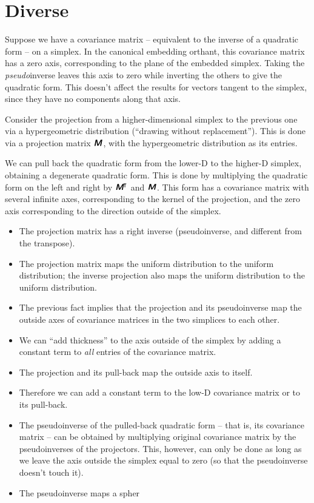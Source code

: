 \documentclass[\ifafour a4paper,12pt,\else a5paper,10pt,\fi%
onecolumn,oneside,article,%
british%
]{memoir}
\theoremstyle{remark}
\theoremstyle{innote}
\newcommand*{\mathte}[1]{\textbf{\textit{\textsf{#1}}}}
\renewcommand*{\|}[1][]{\nonscript\,#1\vert\nonscript\;\mathopen{}}
\newcommand*{\T}{^{\mathord{\!\intercal}}}%
\newcommand*{\ymm}{\mathte{M}}
\begin{document}
\section{Diverse}
\label{sec:diverse}

Suppose we have a covariance matrix -- equivalent to the inverse of a
quadratic form -- on a simplex. In the canonical embedding orthant, this
covariance matrix has a zero axis, corresponding to the plane of the
embedded simplex. Taking the \emph{pseudo}inverse leaves this axis to zero
while inverting the others to give the quadratic form. This doesn't affect
the results for vectors tangent to the simplex, since they have no
components along that axis.

Consider the projection from a higher-dimensional simplex to the previous
one via a hypergeometric distribution (\enquote{drawing without
  replacement}). This is done via a projection matrix $\ymm$, with the
hypergeometric distribution as its entries.

We can pull back the quadratic form from the lower-D to the higher-D
simplex, obtaining a degenerate quadratic form. This is done by multiplying
the quadratic form on the left and right by $\ymm\T$ and $\ymm$. This form
has a covariance matrix with several infinite axes, corresponding to the
kernel of the projection, and the zero axis corresponding to the direction
outside of the simplex.

\begin{itemize}
\item The projection matrix has a right inverse (pseudoinverse, and
  different from the transpose).
\item The projection matrix maps the uniform distribution to the uniform
  distribution; the inverse projection also maps the uniform distribution
  to the uniform distribution.
\item The previous fact implies that the projection and its pseudoinverse
  map the outside axes of covariance matrices in the two simplices to each other.
\item We can \enquote{add thickness} to the axis outside of the simplex by
  adding a constant term to \emph{all} entries of the covariance matrix.
\item The projection and its pull-back map the outside axis to itself.
\item Therefore we can add a constant term to the low-D covariance matrix
  or to its pull-back.
\item The pseudoinverse of the pulled-back quadratic form -- that is, its
  covariance matrix -- can be obtained by multiplying original covariance
  matrix by the pseudoinverses of the projectors. This, however, can only
  be done as long as we leave the axis outside the simplex equal to zero
  (so that the pseudoinverse doesn't touch it).
\item The pseudoinverse maps a spher
\end{itemize}
\end{document}
